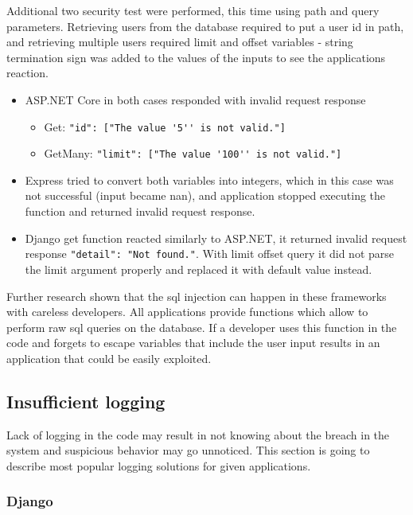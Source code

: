 Additional two security test were performed, this time using path and query parameters. Retrieving users from the database required to put a user id in path, and retrieving multiple users required limit and offset variables - string termination sign was added to the values of the inputs to see the applications reaction.



\begin{itemize}
      \item ASP.NET Core in both cases responded with invalid request response
            \begin{itemize}
                  \item Get: \lstinline{"id": ["The value '5'' is not valid."]}
                  \item GetMany: \lstinline{"limit": ["The value '100'' is not valid."]}
            \end{itemize}
      \item Express tried to convert both variables into integers, which in this case was not successful (input became \acrshort{nan}), and application stopped executing the function and returned invalid request response.
      \item Django get function reacted similarly to ASP.NET, it returned invalid request response \lstinline{"detail": "Not found."}. With limit offset query it did not parse the limit argument properly and replaced it with default value instead.
\end{itemize}

Further research shown that the \acrshort{sql} injection can happen in these frameworks with careless developers. All applications provide functions which allow to perform raw \acrshort{sql} queries on the database. If a developer uses this function in the code and forgets to escape variables that include the user input results in an application that could be easily exploited.

\subsection{Insufficient logging}

Lack of logging in the code may result in not knowing about the breach in the system and suspicious behavior may go unnoticed. This section is going to describe most popular logging solutions for given applications.

\subsubsection{Django}

